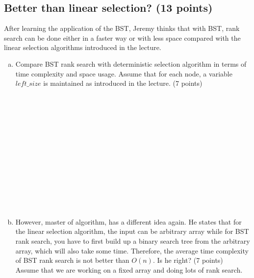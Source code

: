 \documentclass[11pt]{exam}
\begin{document}
\subsection{Better than linear selection? (13 points)}
After learning the application of the BST, Jeremy thinks that with BST, rank search
can be done either in a faster way or with less space compared with the linear selection
algorithms introduced in the lecture.
\begin{enumerate}[a)]
    \item Compare BST rank search with deterministic selection algorithm in
    terms of time complexity and space usage. Assume that for each node, a variable
    $left\_size$ is maintained as introduced in the lecture. (7 points)
    \begin{solution}
    \\ \hspace*{\fill} \\
    \\ \hspace*{\fill} \\
    \\ \hspace*{\fill} \\
    \\ \hspace*{\fill} \\
    \\ \hspace*{\fill} \\
    \\ \hspace*{\fill} \\
    \end{solution}
    \newpage
    \item However, master of algorithm, has a different idea again. He states that for the linear selection algorithm, the input can be arbitrary array while for BST rank search, you have to first build up a binary search tree from the arbitrary array, which will also take some time. Therefore, the average time complexity of BST rank search is not better than $O(n)$. Is he right? (7 points)\\
    Assume that we are working on a fixed array and doing lots of rank search.
    \begin{solution}
    \\ \hspace*{\fill} \\
    \\ \hspace*{\fill} \\

\end{solution}
\end{enumerate}
\end{document}
